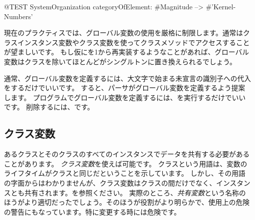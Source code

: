 \documentclass[a4paper,10pt,twoside]{book}
\begin{document}
\begin{code}{@TEST}
SystemOrganization categoryOfElement: #Magnitude --> #'Kernel-Numbers'
\end{code}

現在のプラクティスでは、グローバル変数の使用を厳格に制限します。通常はクラスインスタンス変数やクラス変数を使ってクラスメソッドでアクセスすることが望ましいです。
もし仮に\pharo を1から再実装するようなことがあれば、グローバル変数はクラスを除いてほとんどがシングルトンに置き換えられるでしょう。

通常、グローバル変数を定義するには、大文字で始まる未宣言の識別子への代入をするだけでいいです。
すると、パーサがグローバル変数を定義するよう提案します。
プログラムでグローバル変数を定義するには、を実行するだけでいいです。
削除するには、です。

\subsection{クラス変数}

あるクラスとそのクラスのすべてのインスタンスでデータを共有する必要があることがあります。
\emph{クラス変数}を使えば可能です。
クラスという用語は、変数のライフタイムがクラスと同じだということを示しています。
しかし、その用語の字面からはわかりませんが、クラス変数はクラスの間だけでなく、インスタンスとも共有されます。を参照ください。
実際のところ、\emph{共有変数}という名称のほうがより適切だったでしょう。そのほうが役割がより明らかで、使用上の危険の警告にもなっています。特に変更する時には危険です。
\end{document}
